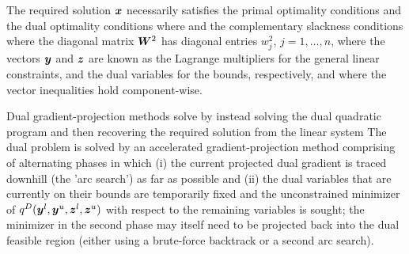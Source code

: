 \documentclass{galahad}
\begin{document}
\galmethod
The required solution ${\bm{x}}$ necessarily satisfies
the primal optimality conditions
and
the dual optimality conditions
where
and the complementary slackness conditions
where the diagonal matrix ${\bm{W}}^{2}$ has diagonal entries $w_{j}^{2}$,
$j = 1, \ldots , n$, where the vectors ${\bm{y}}$ and ${\bm{z}}$ are
known as the Lagrange multipliers for
the general linear constraints, and the dual variables for the bounds,
respectively, and where the vector inequalities hold component-wise.

Dual gradient-projection methods solve  by instead solving the
dual quadratic program
and then recovering the required solution from the linear system
The dual problem  is solved by an accelerated gradient-projection
method comprising of alternating phases in which (i) the current
projected dual gradient is traced downhill (the 'arc search')
as far as possible and (ii) the  dual variables that
are currently on their bounds are temporarily fixed and the unconstrained
minimizer of $q^D({\bm{y}}^{l}, {\bm{y}}^{u}, {\bm{z}}^{l}, {\bm{z}}^{u})$ with respect to the
remaining variables is sought; the minimizer in the second phase may itself
need to be projected back into the dual feasible region (either
using a brute-force backtrack or a second arc search).
\end{document}
